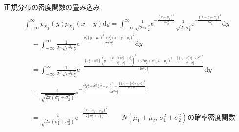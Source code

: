 \documentclass[lualatex,handout]{beamer}
\theoremstyle{definition}
\begin{document}
\begin{frame}{正規分布の密度関数の畳み込み}
\small
\begin{align*}
&\int_{-\infty}^{\infty} p_{X_2}(y)p_{X_1}(x-y) \mathrm{d}y =
\int_{-\infty}^{\infty} \frac1{\sqrt{2\pi\sigma_2^2}}\mathrm{e}^{-\frac{(y-\mu_2)^2}{2\sigma_2^2}} \frac1{\sqrt{2\pi\sigma_1^2}}\mathrm{e}^{-\frac{(x-y-\mu_1)^2}{2\sigma_1^2}} \mathrm{d}y\\
 &\quad=
\int_{-\infty}^{\infty} \frac1{2\pi\sqrt{\sigma_1^2\sigma_2^2}}\mathrm{e}^{-\frac{\sigma_1^2(y-\mu_2)^2 + \sigma_2^2(x-y-\mu_1)^2}{2\sigma_1^2\sigma_2^2}}  \mathrm{d}y\\
 &\quad=
\int_{-\infty}^{\infty} \frac1{2\pi\sqrt{\sigma_1^2\sigma_2^2}}\mathrm{e}^{-\frac{(\sigma_1^2+\sigma_2^2)\left(y-\frac{(\mu_1-x)\sigma_2^2+\mu_2\sigma_1^2}{\sigma_1^2+\sigma_2^2}\right)^2 + \sigma_1^2\mu_2^2 + \sigma_2^2(x-\mu_1)^2 -\frac{((\mu_1-x)\sigma_2^2+\mu_2\sigma_1^2)^2}{\sigma_1^2+\sigma_2^2}}{2\sigma_1^2\sigma_2^2}}  \mathrm{d}y\\
 &\quad=
\frac1{\sqrt{2\pi(\sigma_1^2+\sigma_2^2)}}\mathrm{e}^{-\frac{\sigma_1^2\mu_2^2 + \sigma_2^2(x-\mu_1)^2 -\frac{((\mu_1-x)\sigma_2^2+\mu_2\sigma_1^2)^2}{\sigma_1^2+\sigma_2^2}}{2\sigma_1^2\sigma_2^2}}\\
 &\quad=
\frac1{\sqrt{2\pi(\sigma_1^2+\sigma_2^2)}}\mathrm{e}^{-\frac{(x-\mu_1-\mu_2)^2}{2(\sigma_1^2+\sigma_2^2)}}\qquad \text{$N(\mu_1+\mu_2,\,\sigma_1^2+\sigma_2^2)$の確率密度関数}
\end{align*}
\end{frame}
\end{document}
